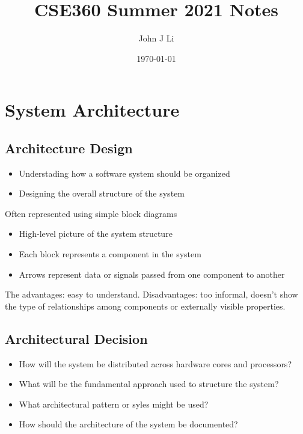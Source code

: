 \documentclass{article}
\title{CSE360 Summer 2021 Notes}
\date{\today}
\author{John J Li}
\begin{document}
    \section*{System Architecture}

    \subsection*{Architecture Design}

    \begin{itemize}
        \item Understading how a software system should be organized
        \item Designing the overall structure of the system
    \end{itemize}

    Often represented using simple block diagrams 
    \begin{itemize}
        \item High-level picture of the system structure
        \item Each block represents a component in the system 
        \item Arrows represent data or signals passed from one component to another 
    \end{itemize}

    The advantages: easy to understand. Disadvantages: too informal, doesn't show the type of 
    relationships among components or externally visible properties.

    
    \subsection*{Architectural Decision}

    \begin{itemize}
        \item How will the system be distributed across hardware cores and processors?
        \item What will be the fundamental approach used to structure the system? 
        \item What architectural pattern or syles might be used?
        \item How should the architecture of the system be documented?
    \end{itemize}
\end{document}
